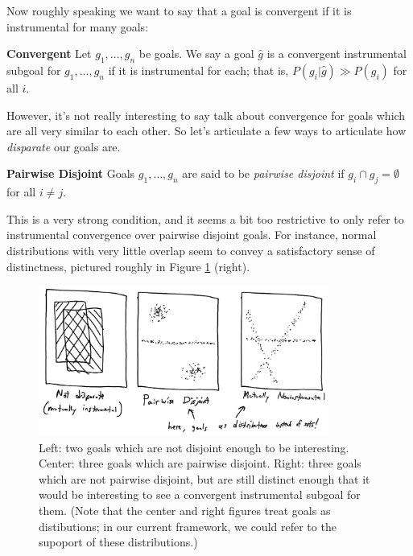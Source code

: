 \documentclass{article}
\begin{document}
Now roughly speaking we want to say that a goal is convergent if it is instrumental for many goals:

\begin{definition}{\textbf{Convergent}}
    Let $g_1, \dots, g_n$ be goals. We say a goal $\hat{g}$ is a convergent instrumental subgoal for $g_1, \dots, g_n$ if it is instrumental for each; that is, $P(g_i|\hat{g})\gg P(g_i)$ for all $i$.
\end{definition}

However, it's not really interesting to say talk about convergence for goals which are all very similar to each other. So let's articulate a few ways to articulate how \emph{disparate} our goals are.

\begin{definition}{\textbf{Pairwise Disjoint}}
    Goals $g_1, \dots, g_n$ are said to be \emph{pairwise disjoint} if $g_i\cap g_j=\emptyset$ for all $i \neq j$.
\end{definition}


This is a very strong condition, and it seems a bit too restrictive to only refer to instrumental convergence over pairwise disjoint goals. For instance, normal distributions with very little overlap seem to convey a satisfactory sense of distinctness, pictured roughly in Figure \ref{fig:disparate} (right).

\begin{figure}[ht]
    \centering
    \includegraphics[width=0.85\textwidth]{pics/disparate.png} 
    \caption{Left: two goals which are not disjoint enough to be interesting. Center: three goals which are pairwise disjoint. Right: three goals which are not pairwise disjoint, but are still distinct enough that it would be interesting to see a convergent instrumental subgoal for them. (Note that the center and right figures treat goals as distibutions; in our current framework, we could refer to the supoport of these distributions.)}
    \label{fig:disparate} 
\end{figure}
\end{document}
